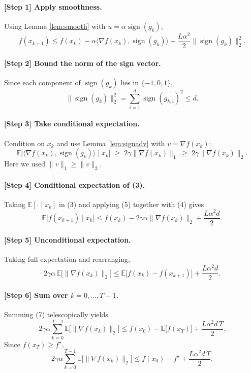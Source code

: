 \documentclass{article}
\newcommand{\sign}{\operatorname{sign}}
\newcommand{\EE}{\mathbb{E}}
\begin{document}
\paragraph{[Step 1] Apply smoothness.}
Using Lemma \ref{lem:smooth} with $u=\alpha\sign(g_{k})$,
\[
f(x_{k+1})\le f(x_{k})-\alpha\langle\nabla f(x_{k}),\sign(g_{k})\rangle+\frac{L\alpha^{2}}{2}\|\sign(g_{k})\|_{2}^{2}. \tag{3}
\]

\paragraph{[Step 2] Bound the norm of the sign vector.}
Since each component of $\sign(g_{k})$ lies in $\{-1,0,1\}$,
\[
\|\sign(g_{k})\|_{2}^{2}= \sum_{i=1}^{d}\sign(g_{k,i})^{2}\le d. \tag{4}
\]

\paragraph{[Step 3] Take conditional expectation.}
Condition on $x_{k}$ and use Lemma \ref{lem:signadv} with $v=\nabla f(x_{k})$:
\[
\EE\!\bigl[\langle\nabla f(x_{k}),\sign(g_{k})\rangle\mid x_{k}\bigr]
\;\ge\;2\gamma\|\nabla f(x_{k})\|_{1}\;\ge\;2\gamma\|\nabla f(x_{k})\|_{2}. \tag{5}
\]
Here we used $\|v\|_{1}\ge\|v\|_{2}$.

\paragraph{[Step 4] Conditional expectation of (3).}
Taking $\EE[\cdot\mid x_{k}]$ in (3) and applying (5) together with (4) gives
\[
\EE\!\bigl[f(x_{k+1})\mid x_{k}\bigr]
\le f(x_{k})-2\gamma\alpha\|\nabla f(x_{k})\|_{2}
+\frac{L\alpha^{2}d}{2}. \tag{6}
\]

\paragraph{[Step 5] Unconditional expectation.}
Taking full expectation and rearranging,
\[
2\gamma\alpha\,\EE\!\bigl[\|\nabla f(x_{k})\|_{2}\bigr]
\le \EE\!\bigl[f(x_{k})-f(x_{k+1})\bigr]+\frac{L\alpha^{2}d}{2}. \tag{7}
\]

\paragraph{[Step 6] Sum over $k=0,\dots,T-1$.}
Summing (7) telescopically yields
\[
2\gamma\alpha\sum_{k=0}^{T-1}\EE\!\bigl[\|\nabla f(x_{k})\|_{2}\bigr]
\le f(x_{0})- \EE\!\bigl[f(x_{T})\bigr] + \frac{L\alpha^{2}d\,T}{2}. \tag{8}
\]
Since $f(x_{T})\ge f^{\star}$,
\[
2\gamma\alpha\sum_{k=0}^{T-1}\EE\!\bigl[\|\nabla f(x_{k})\|_{2}\bigr]
\le f(x_{0})-f^{\star}+ \frac{L\alpha^{2}d\,T}{2}. \tag{9}
\]
\end{document}
